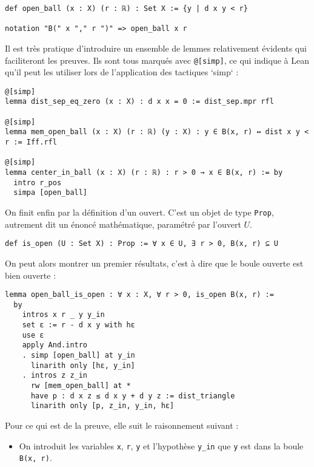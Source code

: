 \documentclass[a4paper, 12pt]{article}
\newcommand{\lean}[1]{\texttt{#1}}
\begin{document}
\begin{verbatim}
def open_ball (x : X) (r : ℝ) : Set X := {y | d x y < r}

notation "B(" x "," r ")" => open_ball x r
\end{verbatim}

Il est très pratique d'introduire un ensemble de lemmes relativement évidents qui faciliteront les preuves. Ils sont tous marqués avec \lean{@[simp]}, ce qui indique à Lean qu'il peut les utiliser lors de l'application des tactiques `simp` :

\begin{verbatim}
@[simp]
lemma dist_sep_eq_zero (x : X) : d x x = 0 := dist_sep.mpr rfl

@[simp]
lemma mem_open_ball (x : X) (r : ℝ) (y : X) : y ∈ B(x, r) ↔ dist x y < r := Iff.rfl

@[simp]
lemma center_in_ball (x : X) (r : ℝ) : r > 0 → x ∈ B(x, r) := by
  intro r_pos
  simpa [open_ball]
\end{verbatim}

On finit enfin par la définition d'un ouvert. C'est un objet de type \lean{Prop}, autrement dit un énoncé mathématique, paramétré par l'ouvert $U$.

\begin{verbatim}
def is_open (U : Set X) : Prop := ∀ x ∈ U, ∃ r > 0, B(x, r) ⊆ U
\end{verbatim}

On peut alors montrer un premier résultats, c'est à dire que le boule ouverte est bien ouverte :

\begin{verbatim}
lemma open_ball_is_open : ∀ x : X, ∀ r > 0, is_open B(x, r) :=
  by
    intros x r _ y y_in
    set ε := r - d x y with hε
    use ε
    apply And.intro
    . simp [open_ball] at y_in
      linarith only [hε, y_in]
    . intros z z_in
      rw [mem_open_ball] at *
      have p : d x z ≤ d x y + d y z := dist_triangle
      linarith only [p, z_in, y_in, hε]
\end{verbatim}

Pour ce qui est de la preuve, elle suit le raisonnement suivant :

\begin{itemize}
    \item On introduit les variables \lean{x}, \lean{r}, \lean{y} et l'hypothèse \lean{y_in} que \lean{y} est dans la boule \lean{B(x, r)}.
\end{itemize}
\end{document}
